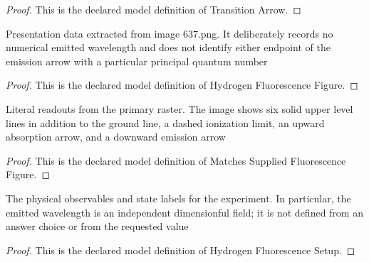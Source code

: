 \begin{proof}
  This is the declared model definition of Transition Arrow.
\end{proof}
\begin{definition}
  \label{def:physics:phyx-mini-0637:phyxminiproblems-problemphyxmini0637-hydrogenfluorescencefigure}
  Presentation data extracted from image 637.png. It deliberately records no numerical emitted wavelength and does not identify either endpoint of the emission arrow with a particular principal quantum number
\end{definition}
\begin{proof}
  This is the declared model definition of Hydrogen Fluorescence Figure.
\end{proof}
\begin{definition}
  \label{def:physics:phyx-mini-0637:phyxminiproblems-problemphyxmini0637-matchessuppliedfluorescencefigure}
  Literal readouts from the primary raster. The image shows six solid upper level lines in addition to the ground line, a dashed ionization limit, an upward absorption arrow, and a downward emission arrow
\end{definition}
\begin{proof}
  This is the declared model definition of Matches Supplied Fluorescence Figure.
\end{proof}
\begin{definition}
  \label{def:physics:phyx-mini-0637:phyxminiproblems-problemphyxmini0637-hydrogenfluorescencesetup}
  The physical observables and state labels for the experiment. In particular, the emitted wavelength is an independent dimensionful field; it is not defined from an answer choice or from the requested value
\end{definition}
\begin{proof}
  This is the declared model definition of Hydrogen Fluorescence Setup.
\end{proof}
